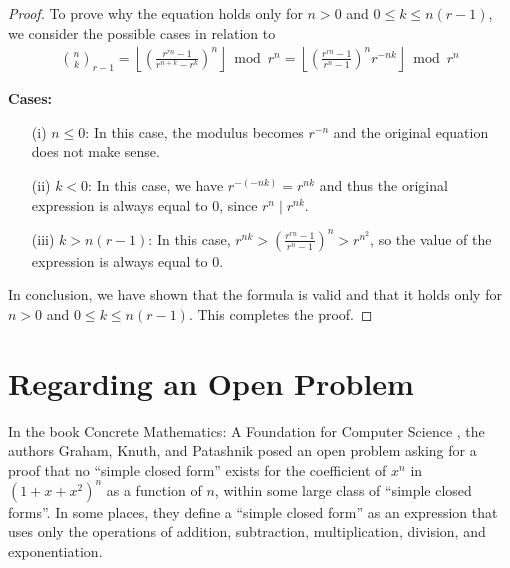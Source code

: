 \documentclass{article}
\theoremstyle{plain}
\theoremstyle{definition}
\begin{document}
\begin{proof}
To prove why the equation holds only for $n > 0$ and $0 \leq k \leq n (r-1)$, we consider the possible cases in relation to
\begin{align*}
    \binom{n}{k}_{r-1} = \left\lfloor \left(\frac{r^{rn} - 1}{r^{n+k} - r^k}\right)^n\right\rfloor \bmod r^n
    = \left\lfloor \left(\frac{r^{rn} - 1}{r^{n} - 1}\right)^n r^{-n k}\right\rfloor \bmod r^n
\end{align*}

\textbf{Cases:}
\begin{enumerate}
    \item[(i)] $n \leq 0$: In this case, the modulus becomes $r^{-n}$ and the original equation does not make sense.
    \item[(ii)] $k < 0$: In this case, we have $r^{-(-nk)} = r^{nk}$ and thus the original expression is always equal to $0$, since $r^{n} \mid r^{nk}$.
    \item[(iii)] $k > n (r-1)$: In this case, $r^{nk} > \left(\frac{r^{rn} - 1}{r^{n} - 1}\right)^{n} > r^{n^2}$, so the value of the expression is always equal to $0$.
\end{enumerate}

In conclusion, we have shown that the formula is valid and that it holds only for $n > 0$ and $0 \leq k \leq n(r-1)$. This completes the proof.
\end{proof}

\section{Regarding an Open Problem} \label{section:regardinganopenproblem}
In the book Concrete Mathematics: A Foundation for Computer Science \cite{graham1994concrete}, the authors Graham, Knuth, and Patashnik posed an open problem asking for a proof that no ``simple closed form'' exists for the coefficient of $x^n$ in $(1+x+x^2)^n$ as a function of $n$, within some large class of ``simple closed forms''. In some places, they define a ``simple closed form'' as an expression that uses only the operations of addition, subtraction, multiplication, division, and exponentiation.
\end{document}
